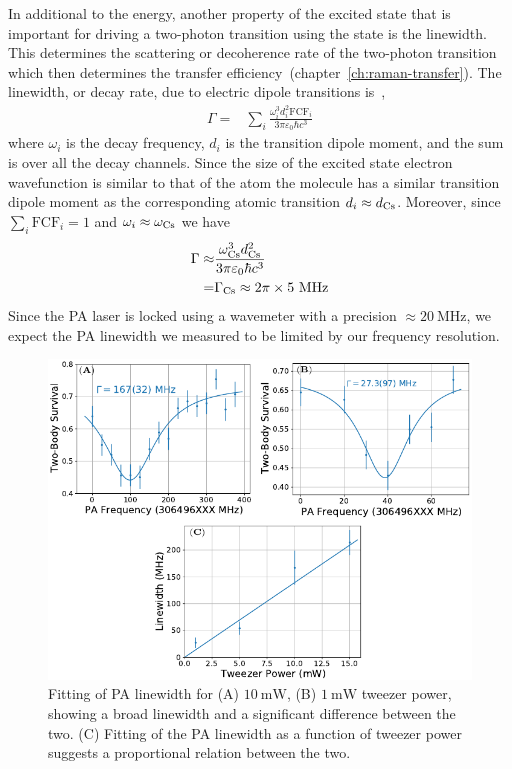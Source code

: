 In additional to the energy, another property of the excited state
that is important for driving a two-photon transition using the state is the linewidth.
This determines the scattering or decoherence rate of
the two-photon transition which then determines
the transfer efficiency~(chapter~\ref{ch:raman-transfer}).
The linewidth, or decay rate, due to electric dipole transitions
is~\cite[p.~197]{bransden_physics_2003},
\begin{align*}
  \Gamma=&\sum_{i}\frac{\omega_i^3d_i^2\mathrm{FCF}_i}{3\pi\varepsilon_0\hbar c^3}
\end{align*}
where $\omega_i$ is the decay frequency, $d_i$ is the transition dipole moment,
and the sum is over all the decay channels.
Since the size of the excited state electron wavefunction is similar to that of the atom
the molecule has a similar transition dipole moment as the corresponding atomic transition
$d_i\approx d_{\mathrm{Cs}}$. Moreover, since $\sum_i\mathrm{FCF}_i=1$ and $\omega_i\approx\omega_{\mathrm{Cs}}$
we have
\begin{align*}
  \Gamma\approx&\frac{\omega_{\mathrm{Cs}}^3d_{\mathrm{Cs}}^2}{3\pi\varepsilon_0\hbar c^3}\\
  =&\Gamma_{\mathrm{Cs}}\approx2\pi\times5~\mathrm{MHz}
\end{align*}
Since the PA laser is locked using a wavemeter with a precision
$\approx\!20~\mathrm{MHz}$, we expect the PA linewidth we measured to be limited
by our frequency resolution.

\begin{figure}
  \centering
  \includegraphics[width=\textwidth]{figures/pa_linewidth_red_twr.pdf}
  \caption[PA linewidth for red detuned tweezer]{
    Fitting of PA linewidth for (A) $10~\mathrm{mW}$, (B) $1~\mathrm{mW}$ tweezer power,
    showing a broad linewidth and a significant difference between the two.
    (C) Fitting of the PA linewidth as a function of tweezer power suggests
    a proportional relation between the two.
    \label{fig:pa:linewidth:red-twr}}
\end{figure}

